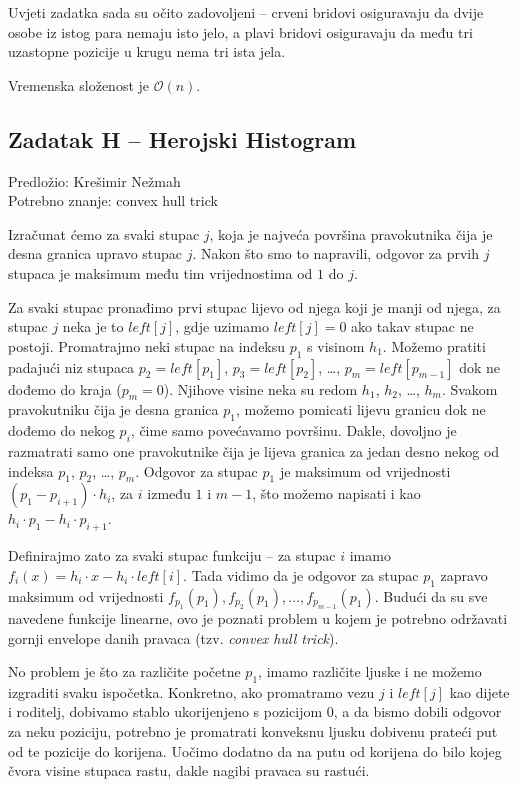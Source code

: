 \documentclass[a4paper]{article}
\begin{document}
Uvjeti zadatka sada su očito zadovoljeni -- crveni bridovi osiguravaju da dvije
osobe iz istog para nemaju isto jelo, a plavi bridovi osiguravaju da među tri
uzastopne pozicije u krugu nema tri ista jela.

Vremenska složenost je $\mathcal{O}(n)$.

\clearpage

\subsection*{Zadatak H -- Herojski Histogram}
\textsf{Predložio: Krešimir Nežmah}\\
\textsf{Potrebno znanje: convex hull trick}

Izračunat ćemo za svaki stupac $j$, koja je najveća površina pravokutnika čija
je desna granica upravo stupac $j$. Nakon što smo to napravili, odgovor za prvih
$j$ stupaca je maksimum među tim vrijednostima od $1$ do $j$.

  Za svaki stupac pronađimo prvi stupac lijevo od njega koji je manji od njega, za
stupac $j$ neka je to $left[j]$, gdje uzimamo $left[j] = 0$ ako takav stupac ne
postoji. Promatrajmo neki stupac na indeksu $p_1$ s visinom $h_1$. Možemo
pratiti padajući niz stupaca $p_2 = left[p_1]$, $p_3 = left[p_2]$, \dots,
$p_m = left[p_{m-1}]$ dok ne dođemo do kraja ($p_m = 0$). Njihove visine neka su
redom $h_1$, $h_2$, \dots, $h_m$. Svakom pravokutniku čija je desna granica
$p_1$, možemo pomicati lijevu granicu dok ne dođemo do nekog $p_i$, čime samo
povećavamo površinu. Dakle, dovoljno je razmatrati samo one pravokutnike čija je
lijeva granica za jedan desno nekog od indeksa $p_1$, $p_2$, \dots, $p_m$.
Odgovor za stupac $p_1$ je maksimum od vrijednosti $(p_1 - p_{i+1}) \cdot h_i$, za
$i$ između $1$ i $m-1$, što možemo napisati i kao $h_i \cdot p_1 - h_i \cdot p_{i+1}$.

Definirajmo zato za svaki stupac funkciju -- za stupac $i$ imamo
$f_i(x) = h_i \cdot x - h_i \cdot left[i]$. Tada vidimo da je odgovor za stupac $p_1$
zapravo maksimum od vrijednosti $f_{p_1}(p_1), f_{p_2}(p_1), \dots, f_{p_{m-1}} (p_1)$.
Budući da su sve navedene funkcije linearne, ovo je poznati problem u kojem je
potrebno održavati gornji envelope danih pravaca (tzv. \textit{convex hull trick}).

No problem je što za različite početne $p_1$, imamo različite ljuske i ne
možemo izgraditi svaku ispočetka. Konkretno, ako promatramo vezu $j$ i $left[j]$
kao dijete i roditelj, dobivamo stablo ukorijenjeno s pozicijom $0$, a da bismo
dobili odgovor za neku poziciju, potrebno je promatrati konveksnu ljusku dobivenu
prateći put od te pozicije do korijena. Uočimo dodatno da na putu od korijena do
bilo kojeg čvora visine stupaca rastu, dakle nagibi pravaca su rastući.
\end{document}
